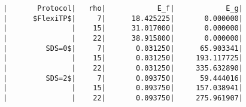 \documentclass{article}
\begin{document}
\begin{verbatim}
|       Protocol|   rho|            E_f|            E_g|
|      $FlexiTP$|     7|      18.425225|       0.000000|
|               |    15|      31.017000|       0.000000|
|               |    22|      38.915800|       0.000000|
|         SDS=0$|     7|       0.031250|      65.903341|
|               |    15|       0.031250|     193.117725|
|               |    22|       0.031250|     335.632890|
|         SDS=2$|     7|       0.093750|      59.444016|
|               |    15|       0.093750|     157.038941|
|               |    22|       0.093750|     275.961907|

\end{verbatim}
\end{document}
